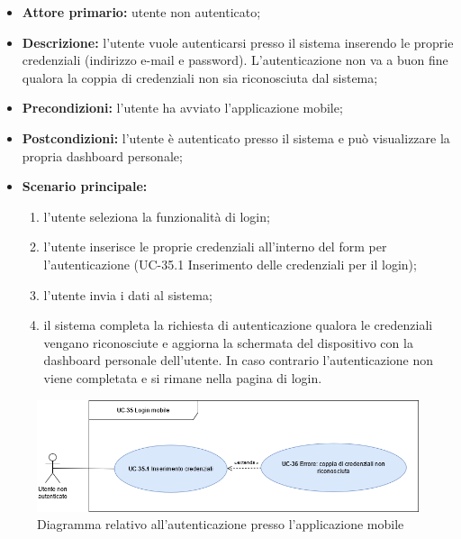 	\begin{itemize}
		\item \textbf{Attore primario:} utente non autenticato;

		\item \textbf{Descrizione:} l'utente vuole autenticarsi presso il sistema inserendo le proprie credenziali (indirizzo e-mail e password). L'autenticazione non va a buon fine qualora la coppia di credenziali non sia riconosciuta dal sistema;

		\item \textbf{Precondizioni:} l'utente ha avviato l'applicazione mobile;

		\item \textbf{Postcondizioni:} l'utente è autenticato presso il sistema e può visualizzare la propria dashboard personale;

		\item \textbf{Scenario principale:}
	  		\begin{enumerate}
		  		\item l'utente seleziona la funzionalità di login;
		  		\item l'utente inserisce le proprie credenziali all'interno del form per l'autenticazione (UC-35.1 Inserimento delle credenziali per il login);
		  		\item l'utente invia i dati al sistema;
		  		\item il sistema completa la richiesta di autenticazione qualora le credenziali vengano riconosciute e aggiorna la schermata del dispositivo con la dashboard personale dell'utente. In caso contrario l'autenticazione non viene completata e si rimane nella pagina di login.
	  		\end{enumerate}
	\end{itemize}

	\begin{figure}[H]
		\centering
		  \includegraphics[scale=0.50]{src/CasiDUso/immagini/LoginMobile.png}
		\caption{Diagramma relativo all'autenticazione presso l'applicazione mobile}
	\end{figure}

